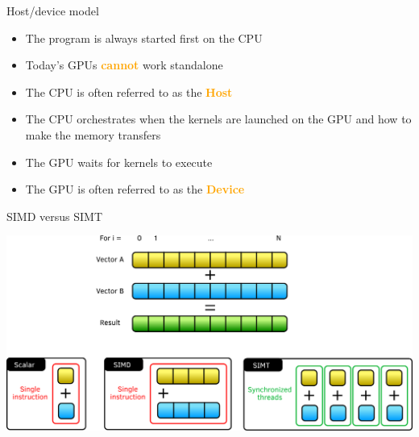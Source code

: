 \documentclass[aspectratio=169]{beamer}
\newcommand{\highlight}[1]{\textcolor{orange}{\textbf{#1}}}
\begin{document}

\begin{frame}{Host/device model}
    \begin{itemize}
        \item The program is always started first on the CPU
        \item Today's GPUs \highlight{cannot} work standalone
        \item The CPU is often referred to as the \highlight{Host}
        \item The CPU orchestrates when the kernels are launched on the GPU and how to make the memory transfers
        \item The GPU waits for kernels to execute
        \item The GPU is often referred to as the \highlight{Device}
    \end{itemize}
\end{frame}


\begin{frame}{SIMD versus SIMT}
    \begin{center}
        \includegraphics[width=\textwidth]{SIMD_vs_SIMT.png}
    \end{center}
\end{frame}

\end{document}

